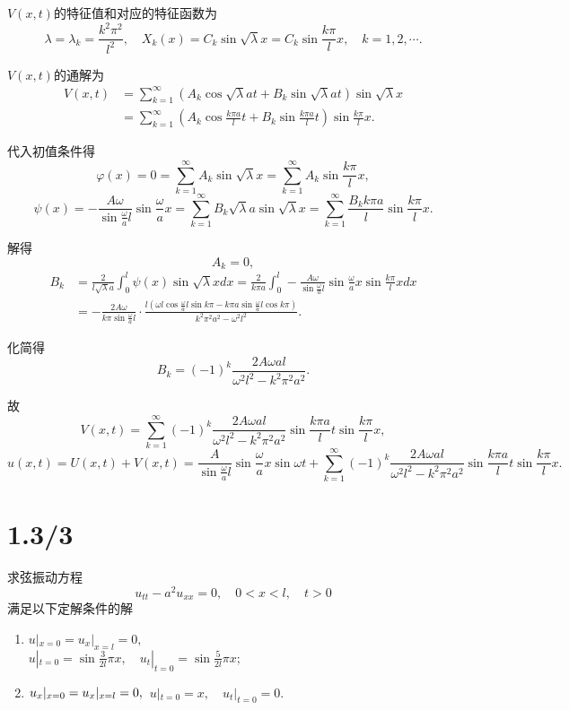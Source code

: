 \documentclass[11pt,a4paper]{article}
\begin{document}
$V(x,t)$的特征值和对应的特征函数为
$$\lambda=\lambda_k=\frac{k^2\pi^2}{l^2},\quad X_k(x)=C_k\sin\sqrt{\lambda}x=C_k\sin\frac{k\pi}{l}x,\quad k=1,2,\cdots.$$

$V(x,t)$的通解为
\begin{align*}
  V(x,t)
   & =\sum_{k=1}^\infty\left(A_k\cos\sqrt{\lambda}at+
  B_k\sin\sqrt{\lambda}at\right)\sin\sqrt{\lambda}x    \\
   & =\sum_{k=1}^\infty\left(A_k\cos\frac{k\pi a}{l}t+
  B_k\sin\frac{k\pi a}{l}t\right)\sin\frac{k\pi}{l}x.
\end{align*}

代入初值条件得
$$\varphi(x)=0=\sum_{k=1}^\infty A_k\sin\sqrt{\lambda}x=\sum_{k=1}^\infty A_k\sin\frac{k\pi }{l}x,$$
$$\psi(x)=-\frac{A\omega}{\sin\frac{\omega}{a}l}\sin\frac{\omega}{a}x=\sum_{k=1}^\infty B_k\sqrt{\lambda}a\sin\sqrt{\lambda}x=\sum_{k=1}^\infty \frac{B_kk\pi a}{l}\sin\frac{k\pi}{l}x.$$

解得
$$A_k=0,$$
\begin{align*}
  B_k & =\frac{2}{l\sqrt{\lambda}a}\int_0^l\psi(x)\sin\sqrt{\lambda}xdx=
  \frac{2}{k\pi a}\int_0^l -\frac{A\omega}{\sin\frac{\omega}{a}l}\sin\frac{\omega}{a}x\sin\frac{k\pi}{l}xdx                                                                         \\
      & =-\frac{2A\omega}{k\pi\sin\frac{\omega}{a}l}\cdot\frac{l\left(\omega l\cos\frac{\omega}{a}l\sin k\pi-k\pi a\sin\frac{\omega}{a}l\cos k\pi\right)}{k^2\pi^2a^2-\omega^2l^2}.
\end{align*}

化简得
$$B_k=(-1)^k\frac{2A\omega al}{\omega^2l^2-k^2\pi^2a^2}.$$

故
$$V(x,t)=\sum_{k=1}^\infty(-1)^k\frac{2A\omega al}{\omega^2l^2-k^2\pi^2a^2}\sin\frac{k\pi a}{l}t\sin\frac{k\pi}{l}x,$$
$$u(x,t)=U(x,t)+V(x,t)=\frac{A}{\sin\frac{\omega}{a}l}\sin\frac{\omega}{a}x\sin\omega t+\sum_{k=1}^\infty(-1)^k\frac{2A\omega al}{\omega^2l^2-k^2\pi^2a^2}\sin\frac{k\pi a}{l}t\sin\frac{k\pi}{l}x.$$

\section{1.3/3}
\begin{problem}
求弦振动方程
$$u_{tt}-a^2u_{xx}=0, \quad 0<x<l,\quad t>0$$
满足以下定解条件的解
\begin{enumerate}
  \item $u|_{x=0}=u_x|_{x=l}=0,$\\
        $u|_{t=0}=\sin\frac{3}{2l}\pi x,\quad u_t|_{t=0}=\sin\frac{5}{2l}\pi x;$
  \item $u_x|_{x=0}=u_x|_{x=l}=0,\\$
        $u|_{t=0}=x,\quad u_t|_{t=0}=0.$
\end{enumerate}
\end{problem}
\end{document}
